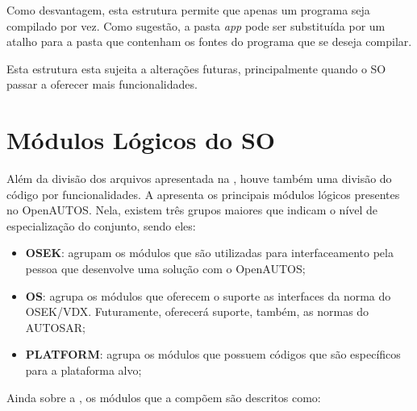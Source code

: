 Como desvantagem, esta estrutura permite que apenas um programa seja compilado por vez. Como sugestão, a pasta \emph{app} pode ser substituída por um atalho para a pasta que contenham os fontes do programa que se deseja compilar.

Esta estrutura esta sujeita a alterações futuras, principalmente quando o SO passar a oferecer mais funcionalidades.

\section{Módulos Lógicos do SO}

Além da divisão dos arquivos apresentada na , houve também uma divisão do código por funcionalidades. A  apresenta os principais módulos lógicos presentes no OpenAUTOS. Nela, existem três grupos maiores que indicam o nível de especialização do conjunto, sendo eles:


\begin{itemize}
	\item \textbf{OSEK}: agrupam os módulos que são utilizadas para interfaceamento pela pessoa que desenvolve uma solução com o OpenAUTOS;
	\item \textbf{OS}: agrupa os módulos que oferecem o suporte as interfaces da norma do OSEK/VDX. Futuramente, oferecerá suporte, também, as normas do AUTOSAR;
	\item \textbf{PLATFORM}: agrupa os módulos que possuem códigos que são específicos para a plataforma alvo;
\end{itemize}

Ainda sobre a , os módulos que a compõem são descritos como:

